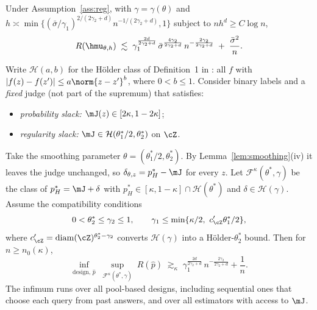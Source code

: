 \begin{target}
\label{tr:upper}
Under Assumption~\ref{ass:reg}, with $\gamma=\gamma(\theta)$ and
$h\asymp\min\{(\bar\sigma/\gamma_1)^{2/(2\gamma_2+d)}n^{-1/(2\gamma_2+d)},1\}$ subject to
$nh^d\ge C\log n$,
\[
  R(\hmu_{\theta,h})\;\lesssim\;\gamma_1^{\frac{2d}{2\gamma_2+d}}\,\bar\sigma^{\frac{4\gamma_2}{2\gamma_2+d}}\,
  n^{-\frac{2\gamma_2}{2\gamma_2+d}}\;+\;\frac{\bar\sigma^2}{n}.
\]
\end{target}

\begin{target}
\label{tr:lower}
Write $\mathcal H(a,b)$ for the H\"older class of Definition~1 in \citet{li2026personalizing}: all
$f$ with $|f(z)-f(z')|\le a\norm{z-z'}^{b}$, where $0<b\le1$. Consider binary labels and a \emph{fixed}
judge (not part of the supremum) that satisfies:
\begin{itemize}
  \item \emph{probability slack:} $\mJ(z)\in[2\kappa,1-2\kappa]$;
  \item \emph{regularity slack:} $\mJ\in\mathcal H(\theta_1^{*}/2,\theta_2^{*})$ on $\cZ$.
\end{itemize}
Take the smoothing parameter $\theta=(\theta_1^{*}/2,\theta_2^{*})$. By
Lemma~\ref{lem:smoothing}(iv) it leaves the judge unchanged, so
$\delta_{\theta,z}=p_H^{*}-\mJ$ for every $z$. Let $\mathcal F^{\kappa}(\theta^{*},\gamma)$ be the class
of $p_H^{*}=\mJ+\delta$ with $p_H^{*}\in[\kappa,1-\kappa]\cap\mathcal H(\theta^{*})$ and
$\delta\in\mathcal H(\gamma)$. Assume the compatibility conditions
\[
  0<\theta_2^{*}\le\gamma_2\le1,\qquad \gamma_1\le\min\{\kappa/2,\ c_{\cZ}'\theta_1^{*}/2\},
\]
where $c_{\cZ}'=\mathrm{diam}(\cZ)^{\theta_2^{*}-\gamma_2}$ converts $\mathcal H(\gamma)$ into a
H\"older-$\theta_2^{*}$ bound. Then for $n\ge n_0(\kappa)$,
\[
  \inf_{\text{design},\,\hat p}\;\sup_{\mathcal F^{\kappa}(\theta^{*},\gamma)}\;R(\hat p)\;\gtrsim_\kappa\;
  \gamma_1^{\frac{2d}{2\gamma_2+d}}\,n^{-\frac{2\gamma_2}{2\gamma_2+d}}+\frac1n .
\]
The infimum runs over all pool-based designs, including sequential ones that choose each query
from past answers, and over all estimators with access to $\mJ$.
\end{target}

